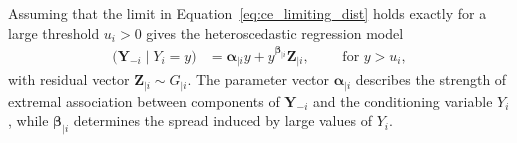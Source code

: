 \documentclass[12pt,compact]{article}
\begin{document}
Assuming that the limit in Equation~\eqref{eq:ce_limiting_dist} holds exactly for a large threshold $u_i > 0$ gives the heteroscedastic regression model
\begin{align}\label{eq:ce_model}
\bigl(\symbf{Y}_{-i} \mid Y_i = y \bigr) &= \symbf{\alpha}_{\mid i}y + y^{\symbf{\beta}_{\mid i}}\symbf{Z}_{\mid i},\qquad \text{ for } y > u_i,
\end{align}
with residual vector $\symbf{Z}_{\mid i} \sim G_{\mid i}$.
The parameter vector $\symbf{\alpha}_{\mid i}$ describes the strength of extremal association between components of $\symbf{Y}_{-i}$ and the conditioning variable $Y_i$, while $\symbf{\beta}_{\mid i}$ determines the spread induced by large values of $Y_i$. 
\end{document}
